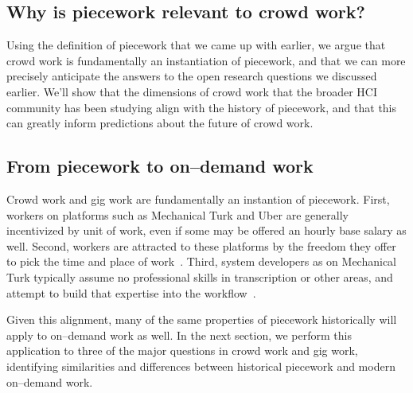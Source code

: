 \documentclass[trackingWork]{subfiles}
\begin{document}
\subsection{Why is piecework relevant to crowd work?}

Using the definition of piecework that we came up with earlier, we argue that
crowd work is fundamentally an instantiation of piecework, and
that we can more precisely anticipate the answers to the open research questions we discussed earlier.
We'll show that the dimensions of crowd work that the broader HCI community has been studying
align with the history of piecework, and that this can greatly inform predictions about the future of crowd work.
\subsection{From piecework to on--demand work}
Crowd work and gig work are fundamentally an instantion of piecework.
First, workers on platforms such as Mechanical Turk and Uber are generally incentivized by unit of work, even if some may be offered an hourly base salary as well.
Second, workers are attracted to these platforms by the freedom they offer to pick the time and place of work~\cite{martin2014being,whyWouldAnyoneBrewer}.
Third, system developers as on Mechanical Turk typically assume no professional skills in transcription or other areas, and attempt to build that expertise into the workflow~\cite{noronha2011platemate,bernsteinSoylent}.

Given this alignment, many of the same properties of piecework historically will apply to on--demand work as well. In the next section, we perform this application to three of the major questions in crowd work and gig work, identifying similarities and differences between historical piecework and modern on--demand work.

\onlyinsubfile{
  \printbibliography
  }
\end{document}
